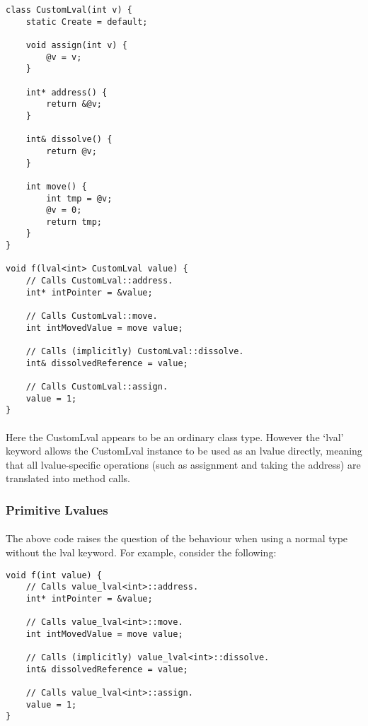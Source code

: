 \documentclass[12pt,twoside,notitlepage]{report}
\begin{document}
\begin{lstlisting}
class CustomLval(int v) {
	static Create = default;
	
	void assign(int v) {
		@v = v;
	}
	
	int* address() {
		return &@v;
	}
	
	int& dissolve() {
		return @v;
	}
	
	int move() {
		int tmp = @v;
		@v = 0;
		return tmp;
	}
}
 
void f(lval<int> CustomLval value) {
	// Calls CustomLval::address.
	int* intPointer = &value;
	
	// Calls CustomLval::move.
	int intMovedValue = move value;
	
	// Calls (implicitly) CustomLval::dissolve.
	int& dissolvedReference = value;
	
	// Calls CustomLval::assign.
	value = 1;
}
\end{lstlisting}

\paragraph{}
Here the CustomLval appears to be an ordinary class type. However the `lval' keyword allows the CustomLval instance to be used as an lvalue directly, meaning that all lvalue-specific operations (such as assignment and taking the address) are translated into method calls.

\subsubsection{Primitive Lvalues}

\paragraph{}
The above code raises the question of the behaviour when using a normal type without the lval keyword. For example, consider the following:

\begin{lstlisting}
void f(int value) {
	// Calls value_lval<int>::address.
	int* intPointer = &value;
	
	// Calls value_lval<int>::move.
	int intMovedValue = move value;
	
	// Calls (implicitly) value_lval<int>::dissolve.
	int& dissolvedReference = value;
	
	// Calls value_lval<int>::assign.
	value = 1;
}
\end{lstlisting}
\end{document}
